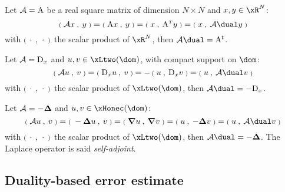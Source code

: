 \begin{xmpl}
Let $\mathcal{A} = {\mathrm A}$ be a real square matrix of dimension $N\times N$ and $x,y \in \xR^N$:
\begin{equation*}
\Inner{\opA x}{y} = \Inner{\matA x}{y} = \Inner{x}{\matA\trans y} = \Inner{x}{\opA\dual y}
\end{equation*}
with ${{\scriptstyle\mathbf{(}}\;\,{\mathbf\cdot}\,\:,\: \,{\mathbf\cdot}\, \;{\scriptstyle\mathbf{)}}}$ the scalar product of $\xR^N$, then $\opA\dual = \matA^t$.
\end{xmpl}

\begin{xmpl}
Let $\mathcal{A} = {\mathrm D}_x $ and $u,v \in \xLtwo(\dom)$, with compact support on $\dom$:
\begin{equation*}
\Inner{\opA u}{v} = \Inner{{\mathrm D}_x u}{v} = -\,\Inner{u}{{\mathrm D}_x v} = \Inner{u}{\opA\dual v}
\end{equation*}
with ${{\scriptstyle\mathbf{(}}\;\,{\mathbf\cdot}\,\:,\: \,{\mathbf\cdot}\, \;{\scriptstyle\mathbf{)}}}$ the scalar product of $\xLtwo(\dom)$, then $\opA\dual = - {\mathrm D}_x$.
\end{xmpl}

\begin{xmpl}
Let $\mathcal{A} = -{\boldsymbol\Delta}$ and $u,v \in \xHonec(\dom)$:
\begin{equation*}
\Inner{\opA u}{v} = \Inner{- \Lap u}{v} = \Inner{\Grad u}{\Grad v} = \Inner{u}{- \Lap v} = \Inner{u}{\opA\dual v}
\end{equation*}
with ${{\scriptstyle\mathbf{(}}\;\,{\mathbf\cdot}\,\:,\: \,{\mathbf\cdot}\, \;{\scriptstyle\mathbf{)}}}$ the scalar product of $\xLtwo(\dom)$, then $\opA\dual = - \Lap$. The Laplace operator is said \textit{self-adjoint}.
\end{xmpl}

\subsection{Duality-based \aposteriori error estimate}

